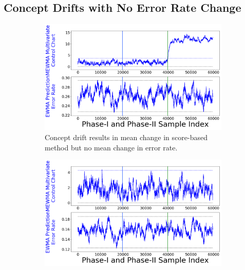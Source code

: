 \documentclass[twoside,11pt]{article}
\begin{document}
\subsection{Concept Drifts with No Error Rate Change}
\label{ss:cd_no_err_change}
\begin{figure}[!htp]
\centering
\begin{subfigure}[t]{0.49\linewidth}
         \centering
           \includegraphics[width = \linewidth]{../figures/v14/sim_11/non_nnet_nonunif_ch_f_0_2/1_sim11_logi_1e-08_0_0015_1.png}
         \caption{Concept drift results in mean change in score-based method but no mean change in error rate.}
         \label{fig:exp_no_err_ch_a}
  \end{subfigure}
\begin{subfigure}[t]{0.49\linewidth}
         \centering
	       \includegraphics[width = \linewidth]{../figures/v14/sim_11/non_nnet_nonunif_ch_f_0_2_followup/1_sim11_logi_1e-08_0_0015_1.png}

\end{subfigure}
\end{figure}
\end{document}
